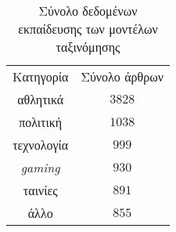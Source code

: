 \begin{table}
    \captionsetup{justification=centering}
    \begin{center}
        \caption{Σύνολο δεδομένων εκπαίδευσης των μοντέλων ταξινόμησης}
        \label{tab:training_data}
        \begin{tabular}{ | c | c |}
            \hline
            \rowcolor{Gray}
            Κατηγορία & Σύνολο άρθρων\\
            αθλητικά & $3828$\\
            πολιτική & $1038$\\
            τεχνολογία & $999$\\
            \emph{gaming} & $930$\\
            ταινίες & $891$\\
            άλλο & $855$\\
            \hline
        \end{tabular}
    \end{center}
\end{table}